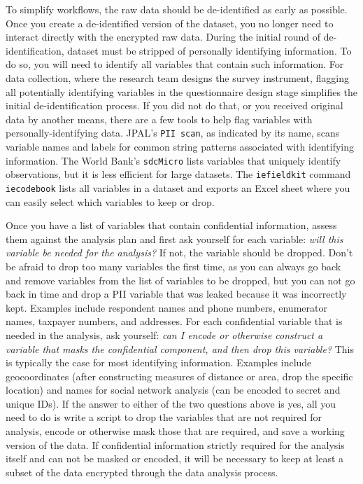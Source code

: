 \begin{fullwidth}
To simplify workflows, the raw data should be de-identified as early as possible.
Once you create a de-identified version of the dataset,
you no longer need to interact directly with the encrypted raw data.
During the initial round of de-identification, 
dataset must be stripped of personally identifying information.
To do so, you will need to identify all variables that contain
such information.
For data collection, where the research team designs the survey instrument,
flagging all potentially identifying variables in the questionnaire design stage
simplifies the initial de-identification process.
If you did not do that, or you received original data by another means,
there are a few tools to help flag variables with personally-identifying data.
JPAL's \texttt{PII scan}, as indicated by its name,
scans variable names and labels for common string patterns associated with identifying information.
The World Bank's \texttt{sdcMicro}
lists variables that uniquely identify observations, 
but it is less efficient for large datasets.
The \texttt{iefieldkit} command \texttt{iecodebook}
lists all variables in a dataset and exports an Excel sheet
where you can easily select which variables to keep or drop.

Once you have a list of variables that contain confidential information,
assess them against the analysis plan and first ask yourself for each variable:
\textit{will this variable be needed for the analysis?}
If not, the variable should be dropped.
Don't be afraid to drop too many variables the first time,
as you can always go back and remove variables from the list of variables to be dropped,
but you can not go back in time and drop a PII variable that was leaked
because it was incorrectly kept.
Examples include respondent names and phone numbers, enumerator names, taxpayer 
numbers, and addresses.
For each confidential variable that is needed in the analysis, ask yourself:
\textit{can I encode or otherwise construct a variable that masks the confidential component, and
	then drop this variable?}
This is typically the case for most identifying information.
Examples include geocoordinates
(after constructing measures of distance or area,
drop the specific location)
and names for social network analysis (can be encoded to secret and unique IDs).
If the answer to either of the two questions above is yes,
all you need to do is write a script to drop the variables that are not required for analysis,
encode or otherwise mask those that are required,
and save a working version of the data.
If confidential information strictly required for the analysis itself and can not be
masked or encoded,
it will be necessary to keep at least a subset of the data encrypted through
the data analysis process.


\end{fullwidth}

